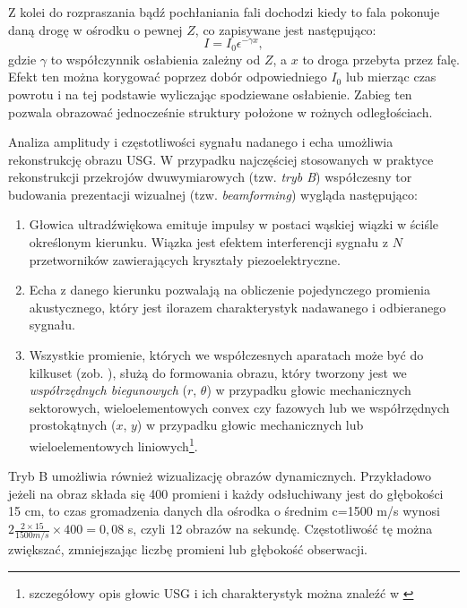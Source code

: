 Z kolei do rozpraszania bądź pochłaniania fali dochodzi kiedy to fala pokonuje daną drogę w ośrodku o pewnej $Z$, co zapisywane jest następująco:
\begin{equation}
I=I_0 \epsilon^{-\gamma x},
\end{equation}
gdzie $\gamma$ to współczynnik osłabienia zależny od $Z$, a $x$ to droga przebyta przez falę. Efekt ten można korygować poprzez dobór odpowiedniego $I_0$ lub mierząc czas powrotu i na tej podstawie wyliczając spodziewane osłabienie. Zabieg ten pozwala obrazować jednocześnie struktury położone w rożnych odległościach.

Analiza amplitudy i częstotliwości sygnału nadanego i echa umożliwia rekonstrukcję obrazu USG. W przypadku najczęściej stosowanych w praktyce rekonstrukcji przekrojów dwuwymiarowych (tzw. \textit{tryb B}) współczesny tor budowania prezentacji wizualnej (tzw. \textit{beamforming}) wygląda następująco: 
\begin{enumerate}
	\item Głowica ultradźwiękowa emituje impulsy w postaci wąskiej wiązki w ściśle określonym kierunku. Wiązka jest efektem interferencji sygnału z $N$ przetworników zawierających kryształy piezoelektryczne.
	\item Echa z danego kierunku pozwalają na obliczenie pojedynczego promienia akustycznego, który jest ilorazem charakterystyk nadawanego i odbieranego sygnału.
	\item Wszystkie promienie, których we współczesnych aparatach może być do kilkuset (zob. \cite{GEVoluson}), służą do formowania obrazu, który tworzony jest we \textit{współrzędnych biegunowych} ($r$, $\theta$) w przypadku głowic mechanicznych sektorowych, wieloelementowych convex czy fazowych lub we współrzędnych prostokątnych ($x$, $y$) w przypadku głowic mechanicznych lub wieloelementowych liniowych\footnote{szczegółowy opis głowic USG i ich charakterystyk można znaleźć w \cite{GlowiceUSG}}. 
\end{enumerate}

Tryb B umożliwia również wizualizację obrazów dynamicznych. Przykładowo jeżeli na obraz składa się 400 promieni i każdy odsłuchiwany jest do głębokości 15 cm, to czas gromadzenia danych dla ośrodka o średnim c=1500 m/s wynosi $2\frac{2\times15}{1500 m/s}\times400 = 0,08$ s, czyli 12 obrazów na sekundę. Częstotliwość tę można zwiększać, zmniejszając liczbę promieni lub głębokość obserwacji.

